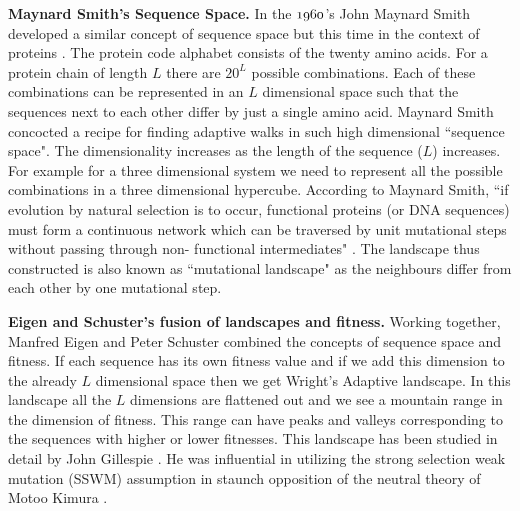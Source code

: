 \documentclass[oneside,11pt,a4paper]{book}
\begin{document}
\textbf{Maynard Smith's Sequence Space.}
In the $\oldstylenums{1960}$'s John Maynard Smith developed a similar concept of sequence space but this time in the context of proteins \citep{maynard-smith:1970aa}.
The protein code alphabet consists of the twenty amino acids.
For a protein chain of length $L$ there are $20^L$ possible combinations.
Each of these combinations can be represented in an $L$ dimensional space such that the sequences next to each other differ by just a single amino acid.
Maynard Smith concocted a recipe for finding adaptive walks in such high dimensional ``sequence space".
The dimensionality increases as the length of the sequence ($L$) increases.
For example for a three dimensional system we need to represent all the possible combinations in a three dimensional hypercube.
According to Maynard Smith, ``if evolution by natural selection is to occur, functional proteins (or DNA sequences) must form a continuous network which can be traversed by unit mutational steps without passing through non- functional intermediates" \citep{maynard-smith:1970aa}.
The landscape thus constructed is also known as ``mutational landscape" as the neighbours differ from each other by one mutational step.

\textbf{Eigen and Schuster's fusion of landscapes and fitness.}
Working together, Manfred Eigen and Peter Schuster  combined the concepts of sequence space and fitness.
If each sequence has its own fitness value and if we add this dimension to the already $L$ dimensional space then we get Wright's Adaptive landscape.
In this landscape all the $L$ dimensions are flattened out and we see a mountain range in the dimension of fitness.
This range can have peaks and valleys corresponding to the sequences with higher or lower fitnesses.
This landscape has been studied in detail by John Gillespie \citep{gillespie:1983aa,gillespie:1984aa}.
He was influential in utilizing the strong selection weak mutation (SSWM) assumption in staunch opposition of the neutral theory of Motoo Kimura \citep{gillespie:1984ab}.
\end{document}
